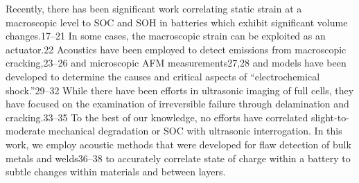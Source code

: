 Recently, there has been significant work correlating static strain at a macroscopic level to SOC and SOH in batteries which exhibit significant volume changes.17–21 In some cases, the macroscopic strain can be exploited as an actuator.22 Acoustics have been employed to detect emissions from macroscopic cracking,23–26 and microscopic AFM measurements27,28 and models have been developed to determine the causes and critical aspects of “electrochemical shock.”29–32 While there have been efforts in ultrasonic imaging of full cells, they have focused on the examination of irreversible failure through delamination and cracking.33–35 To the best of our knowledge, no efforts have correlated slight-to-moderate mechanical degradation or SOC with ultrasonic interrogation. In this work, we employ acoustic methods that were developed for flaw detection of bulk metals and welds36–38 to accurately correlate state of charge within a battery to subtle changes within materials and between layers.